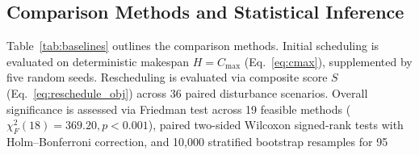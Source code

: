 \documentclass[journal,10pt]{IEEEtran}
\begin{document}
\subsection{Comparison Methods and Statistical Inference}

Table~\ref{tab:baselines} outlines the comparison methods. Initial scheduling is evaluated on deterministic makespan $H=C_{\max}$ (Eq.~\eqref{eq:cmax}), supplemented by five random seeds. Rescheduling is evaluated via composite score $S$ (Eq.~\eqref{eq:reschedule_obj}) across 36 paired disturbance scenarios. Overall significance is assessed via Friedman test across 19 feasible methods ($\chi_F^2(18)=369.20, p<0.001$), paired two-sided Wilcoxon signed-rank tests with Holm--Bonferroni correction, and 10,000 stratified bootstrap resamples for 95%
\end{document}
